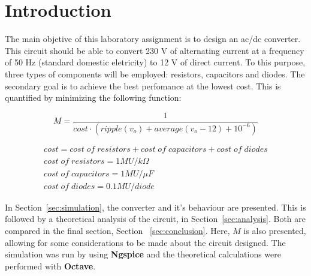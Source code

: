 \section{Introduction}
\label{sec:introduction}


The main objetive of this laboratory assignment is to design an ac/dc converter. This circuit should be able to convert 230 V of alternating current at a frequency of 50 Hz (standard domestic eletricity) to 12 V of direct current. To this purpose, three types of components will be employed: resistors, capacitors and diodes. The secondary goal is to achieve the best perfomance at the lowest cost. This is quantified by minimizing the following function:

\begin{equation}
  M = \frac{1}{cost \cdot (ripple(v_o) + average(v_o-12) + 10^{-6})}
\end{equation}

\begin{gather*}
  cost = cost\;of\;resistors + cost\;of\;capacitors + cost\;of\;diodes \\
  cost\;of\;resistors = 1 MU/k\Omega \\
  cost\;of\;capacitors = 1 MU/\mu F \\
  cost\;of\;diodes = 0.1 MU/diode
\end{gather*}

In Section~\ref{sec:simulation}, the converter and it's behaviour are presented. This is followed by a theoretical analysis of the circuit, in Section~\ref{sec:analysis}. Both are compared in the final section, Section ~\ref{sec:conclusion}. Here, $M$ is also presented, allowing for some considerations to be made about the circuit designed. The simulation was run by using {\bf Ngspice} and the theoretical calculations were performed with {\bf Octave}.
